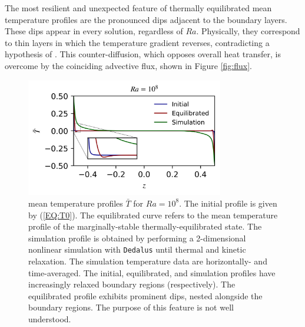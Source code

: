 \documentclass[reprint,amsmath,amssymb,aps]{revtex4-1}
\begin{document}
The most resilient and unexpected feature of thermally equilibrated mean temperature profiles are the pronounced dips adjacent to the boundary layers. 
These dips appear in every solution, regardless of $Ra$. 
Physically, they correspond to thin layers in which the temperature gradient reverses, contradicting a hypothesis of \cite{Malkus}. 
This counter-diffusion, which opposes overall heat transfer, is overcome by the coinciding advective flux, shown in Figure \ref{fig:flux}. 
\begin{figure}
    \centering
    \includegraphics[width=3.4in]{T_profs_na.png}
    \caption{mean temperature profiles $\bar{T}$ for $Ra = 10^8$. 
    The initial profile is given by (\ref{EQ:T0}). 
    The equilibrated curve refers to the mean temperature profile of the marginally-stable thermally-equilibrated state. 
    The simulation profile is obtained by performing a 2-dimensional nonlinear simulation with \texttt{Dedalus} until thermal and kinetic relaxation. 
    The simulation temperature data are horizontally- and time-averaged. 
    The initial, equilibrated, and simulation profiles have increasingly relaxed boundary regions (respectively). 
    The equilibrated profile exhibits prominent dips, nested alongside the boundary regions. 
    The purpose of this feature is not well understood.}
    \label{fig:T0_profiles}
\end{figure}
\end{document}
